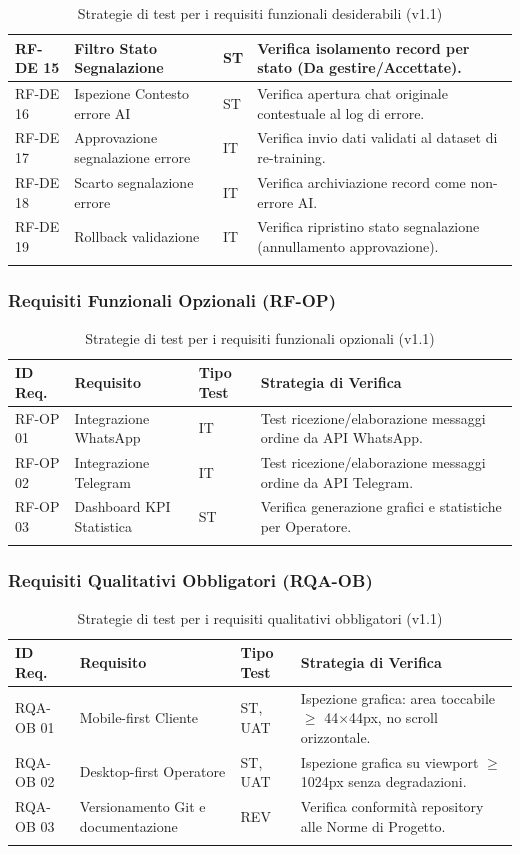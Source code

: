 \documentclass[a4paper,11pt,oneside]{scrartcl}
\begin{document}
\begin{longtable}{|p{1.5cm}|p{5.5cm}|p{1.8cm}|p{5cm}|}
RF-DE 15 & Filtro Stato Segnalazione & ST & Verifica isolamento record per stato (Da gestire/Accettate). \\ \hline
RF-DE 16 & Ispezione Contesto errore AI & ST & Verifica apertura chat originale contestuale al log di errore. \\ \hline
RF-DE 17 & Approvazione segnalazione errore & IT & Verifica invio dati validati al dataset di re-training. \\ \hline
RF-DE 18 & Scarto segnalazione errore & IT & Verifica archiviazione record come non-errore AI. \\ \hline
RF-DE 19 & Rollback validazione & IT & Verifica ripristino stato segnalazione (annullamento approvazione). \\ \hline
\caption{Strategie di test per i requisiti funzionali desiderabili (v1.1)}
\end{longtable}

\newpage
\subsubsection{Requisiti Funzionali Opzionali (RF-OP)}

\begin{longtable}{|p{1.5cm}|p{5.5cm}|p{1.8cm}|p{5cm}|}
\hline
\textbf{ID Req.} & \textbf{Requisito} & \textbf{Tipo Test} & \textbf{Strategia di Verifica} \\
\hline
RF-OP 01 & Integrazione WhatsApp & IT & Test ricezione/elaborazione messaggi ordine da API WhatsApp. \\ \hline
RF-OP 02 & Integrazione Telegram & IT & Test ricezione/elaborazione messaggi ordine da API Telegram. \\ \hline
RF-OP 03 & Dashboard KPI Statistica & ST & Verifica generazione grafici e statistiche per Operatore. \\ \hline
\caption{Strategie di test per i requisiti funzionali opzionali (v1.1)}
\end{longtable}

\newpage
\subsubsection{Requisiti Qualitativi Obbligatori (RQA-OB)}

\begin{longtable}{|p{1.5cm}|p{5.5cm}|p{1.8cm}|p{5cm}|}
\hline
\textbf{ID Req.} & \textbf{Requisito} & \textbf{Tipo Test} & \textbf{Strategia di Verifica} \\
\hline
RQA-OB 01 & Mobile-first Cliente & ST, UAT & Ispezione grafica: area toccabile $\ge$ 44$\times$44px, no scroll orizzontale. \\ \hline
RQA-OB 02 & Desktop-first Operatore & ST, UAT & Ispezione grafica su viewport $\ge$ 1024px senza degradazioni. \\ \hline
RQA-OB 03 & Versionamento Git e documentazione & REV & Verifica conformità repository alle Norme di Progetto. \\ \hline
\caption{Strategie di test per i requisiti qualitativi obbligatori (v1.1)}
\end{longtable}
\end{document}
